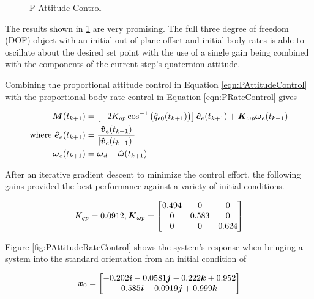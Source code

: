 \begin{figure}[H]
  \centerline{}
  \caption{P Attitude Control}
  \label{fig:PAttitudeControl}
\end{figure}

The results shown in \ref{fig:PAttitudeControl} are very promising.  The full three degree of freedom (DOF) object with an initial out of plane offset and initial body rates is able to oscillate about the desired set point with the use of a single gain being combined with the components of the current step's quaternion attitude.

Combining the proportional attitude control in Equation \ref{eqn:PAttitudeControl} with the proportional body rate control in Equation \ref{eqn:PRateControl} gives

\begin{subequations}
  \begin{align}
    \boldsymbol{M}(t_{k+1}) &= \left[-2 K_{qp} \cos^{-1} \big(\hat{q}_{e0}(t_{k+1}) \big) \right] \boldsymbol{\hat{e}}_e(t_{k+1}) + \boldsymbol{K}_{\omega p} \boldsymbol{\omega}_e(t_{k+1})\\
    \text{where } \boldsymbol{\hat{e}}_e(t_{k+1}) &= \frac{\boldsymbol{\hat{v}}_e(t_{k+1})}{|\boldsymbol{\hat{v}}_e(t_{k+1})|} \\
    \boldsymbol{\omega}_e(t_{k+1}) &= \boldsymbol{\omega}_d - \boldsymbol{\hat{\omega}}(t_{k+1})
  \end{align}
  \label{eqn:PAttitudeAndRateControl}
\end{subequations}

After an iterative gradient descent to minimize the control effort, the following gains provided the best performance against a variety of initial conditions.

\begin{equation}
  K_{qp} = 0.0912, \boldsymbol{K}_{\omega p} = \begin{bmatrix} 0.494 & 0 & 0 \\ 0 & 0.583 & 0 \\ 0 & 0 & 0.624 \end{bmatrix}
\end{equation}

Figure \ref{fig:PAttitudeRateControl} shows the system's response when bringing a system into the standard orientation from an initial condition of

\begin{equation}
  \boldsymbol{x}_0 = \begin{bmatrix} -0.202 \boldsymbol{i} -0.0581 \boldsymbol{j} -0.222 \boldsymbol{k} +0.952 \\ 0.585 \boldsymbol{i} +0.0919 \boldsymbol{j} +0.999 \boldsymbol{k} \end{bmatrix}
\end{equation}

